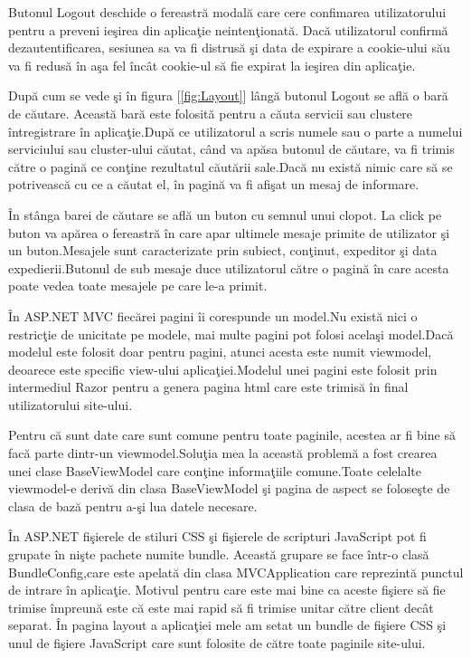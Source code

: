 \documentclass[a4paper,12pt]{report}
\let\oldref\ref
\renewcommand{\ref}[1]{[\oldref{#1}]}
\begin{document}
Butonul Logout deschide o fereastr\u a modal\u a care cere confimarea utilizatorului pentru a preveni
ie\c sirea din aplica\c tie neinten\c tionat\u a. Dac\u a utilizatorul confirm\u a dezautentificarea,
sesiunea sa va fi distrus\u a \c si data de expirare a cookie-ului s\u au va fi redus\u a \^in a\c sa fel
\^inc\^at cookie-ul s\u a fie expirat la ie\c sirea din aplica\c tie.

Dup\u a cum se vede \c si \^in figura \ref{fig:Layout} l\^ang\u a butonul Logout se afl\u a o bar\u a de 
c\u autare. Aceast\u a bar\u a este folosit\u a pentru a c\u auta servicii sau clustere \^intregistrare \^in 
aplica\c tie.Dup\u a ce utilizatorul a scris numele sau o parte a numelui serviciului sau cluster-ului c\u autat,
c\^and va ap\u asa butonul de c\u autare, va fi trimis c\u atre o pagin\u a ce con\c tine rezultatul c\u aut\u arii
sale.Dac\u a nu exist\u a nimic care s\u a se potriveasc\u a cu ce a c\u autat el, \^in pagin\u a va fi afi\c sat un mesaj
de informare.

\^In st\^ anga barei de c\u autare se afl\u a un buton cu semnul unui clopot. La click pe buton va ap\u area
o fereastr\u a \^in care apar ultimele mesaje primite de utilizator \c si un buton.Mesajele sunt caracterizate 
prin subiect, con\c tinut, expeditor \c si data expedierii.Butonul de sub mesaje duce utilizatorul c\u atre o 
pagin\u a \^in care acesta poate vedea toate mesajele pe care le-a primit.

\^In ASP.NET MVC fiec\u arei pagini \^ii corespunde un model.Nu exist\u a nici o restric\c tie de unicitate
pe modele, mai multe pagini pot folosi acela\c si model.Dac\u a modelul este folosit doar pentru pagini,
atunci acesta este numit viewmodel, deoarece este specific view-ului aplica\c tiei.Modelul unei pagini 
este folosit prin intermediul Razor pentru a genera pagina html care este trimis\u a \^in final utilizatorului
site-ului.

Pentru c\u a sunt date care sunt comune pentru toate paginile, acestea ar fi bine s\u a fac\u a parte dintr-un
viewmodel.Solu\c tia mea la aceast\u a problem\u a a fost crearea unei clase BaseViewModel care con\c tine informa\c tiile 
comune.Toate celelalte viewmodel-e deriv\u a din clasa BaseViewModel \c si pagina de aspect se folose\c ste de clasa
de baz\u a pentru a-\c si lua datele necesare.

\^In ASP.NET fi\c sierele de stiluri CSS \c si fi\c sierele de scripturi JavaScript pot fi grupate \^in ni\c ste 
pachete numite bundle. Aceast\u a grupare se face \^intr-o clas\u a BundleConfig,care este apelat\u a din clasa 
MVCApplication care reprezint\u a punctul de intrare \^in aplica\c tie. Motivul pentru care este mai bine ca aceste fi\c siere s\u a fie trimise \^impreun\u a 
este c\u a este mai rapid s\u a fi trimise unitar c\u atre client dec\^at separat. \^In pagina layout a aplica\c tiei 
mele am setat un  bundle de fi\c siere CSS \c si unul de fi\c siere JavaScript care sunt folosite de c\u atre toate paginile
site-ului.
\end{document}
